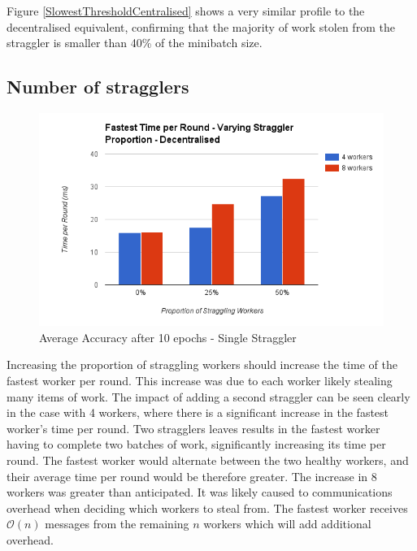 \documentclass[12pt]{article}
\begin{document}
Figure \ref{SlowestThresholdCentralised} shows a very similar profile to the decentralised equivalent, confirming that the majority of work stolen from the straggler is smaller than 40\% of the minibatch size.

\subsection{Number of stragglers}

\begin{figure}[H]
  \centering
  \includegraphics[width=6in]{FastestStragglerDecentralised}
  \caption[]{Average Accuracy after 10 epochs - Single Straggler}
  \label{FastestStragglerDecentralised}
\end{figure}

Increasing the proportion of straggling workers should increase the time of the fastest worker per round. This increase was due to each worker likely stealing many items of work. The impact of adding a second straggler can be seen clearly in the case with 4 workers, where there is a significant increase in the fastest worker's time per round. Two stragglers leaves results in the fastest worker having to complete two batches of work, significantly increasing its time per round. The fastest worker would alternate between the two healthy workers, and their average time per round would be therefore greater.
\newline
\newline
The increase in 8 workers was greater than anticipated. It was likely caused to communications overhead when deciding which workers to steal from. The fastest worker receives $\mathcal{O}(n)$ messages from the remaining $n$ workers which will add additional overhead.
\end{document}
